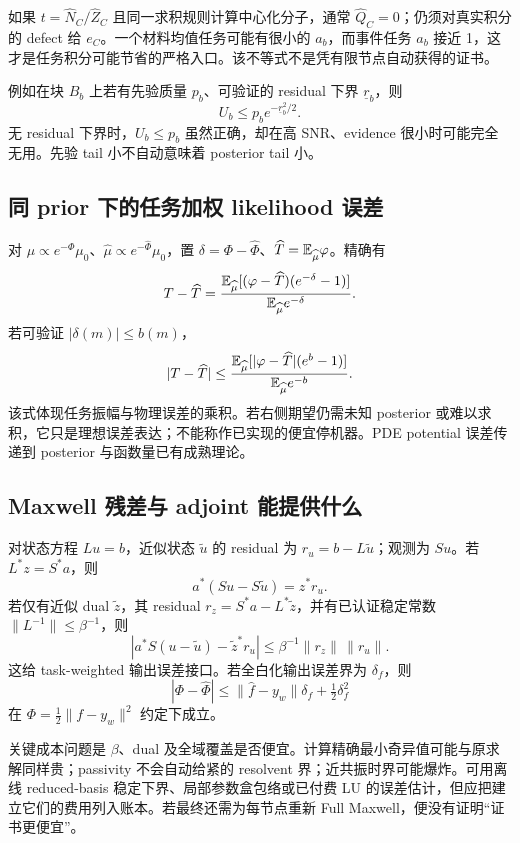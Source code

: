 如果 $t=\widehat N_C/\widehat Z_C$ 且同一求积规则计算中心化分子，通常 $\widehat Q_C=0$；仍须对真实积分的 defect 给 $e_C$。一个材料均值任务可能有很小的 $a_b$，而事件任务 $a_b$ 接近 1，这才是任务积分可能节省的严格入口。该不等式不是凭有限节点自动获得的证书。

例如在块 $B_b$ 上若有先验质量 $p_b$、可验证的 residual 下界 $\underline r_b$，则
\[
U_b\le p_b e^{-\underline r_b^2/2}.
\]
无 residual 下界时，$U_b\le p_b$ 虽然正确，却在高 SNR、evidence 很小时可能完全无用。先验 tail 小不自动意味着 posterior tail 小。

\subsection{同 prior 下的任务加权 likelihood 误差}
对 $\mu\propto e^{-\Phi}\mu_0$、$\widehat\mu\propto e^{-\widehat\Phi}\mu_0$，置
$\delta=\Phi-\widehat\Phi$、$\widehat T=\mathbb E_{\widehat\mu}\varphi$。精确有
\begin{equation}
T-\widehat T=
\frac{\mathbb E_{\widehat\mu}[(\varphi-\widehat T)(e^{-\delta}-1)]}
{\mathbb E_{\widehat\mu}e^{-\delta}}.
\label{eq:weighted-potential}
\end{equation}
若可验证 $|\delta(m)|\le b(m)$，
\[
|T-\widehat T|
\le
\frac{\mathbb E_{\widehat\mu}[|\varphi-\widehat T|(e^{b}-1)]}
{\mathbb E_{\widehat\mu}e^{-b}}.
\]
该式体现任务振幅与物理误差的乘积。若右侧期望仍需未知 posterior 或难以求积，它只是理想误差表达；不能称作已实现的便宜停机器。PDE potential 误差传递到 posterior 与函数量已有成熟理论。

\subsection{Maxwell 残差与 adjoint 能提供什么}
对状态方程 $Lu=b$，近似状态 $\widetilde u$ 的 residual 为 $r_u=b-L\widetilde u$；观测为 $Su$。若
$L^*z=S^*a$，则
\[
a^*(Su-S\widetilde u)=z^*r_u.
\]
若仅有近似 dual $\widetilde z$，其 residual
$r_z=S^*a-L^*\widetilde z$，并有已认证稳定常数
$\|L^{-1}\|\le\beta^{-1}$，则
\[
\left|a^*S(u-\widetilde u)-\widetilde z^*r_u\right|
\le \beta^{-1}\|r_z\|\,\|r_u\|.
\]
这给 task-weighted 输出误差接口。若全白化输出误差界为 $\delta_f$，则
\[
|\Phi-\widehat\Phi|
\le\|\widehat f-y_w\|\delta_f+\tfrac12\delta_f^2
\]
在 $\Phi=\frac12\|f-y_w\|^2$ 约定下成立。

关键成本问题是 $\beta$、dual 及全域覆盖是否便宜。计算精确最小奇异值可能与原求解同样贵；passivity 不会自动给紧的 resolvent 界；近共振时界可能爆炸。可用离线 reduced-basis 稳定下界、局部参数盒包络或已付费 LU 的误差估计，但应把建立它们的费用列入账本。若最终还需为每节点重新 Full Maxwell，便没有证明“证书更便宜”。

